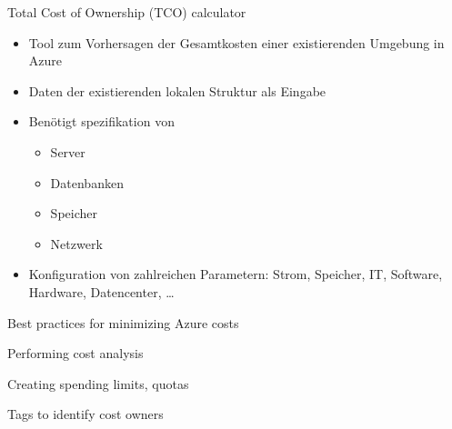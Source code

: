 \begin{flashcard}[Understand]{Total Cost of Ownership (TCO) calculator}
    \begin{itemize}
        \item Tool zum Vorhersagen der Gesamtkosten einer existierenden Umgebung in Azure
        \item Daten der existierenden lokalen Struktur als Eingabe
        \item Benötigt spezifikation von
        \begin{itemize}
            \item Server
            \item Datenbanken
            \item Speicher
            \item Netzwerk
        \end{itemize}
        \item Konfiguration von zahlreichen Parametern:\newline
        Strom, Speicher, IT, Software, Hardware, Datencenter, \ldots
    \end{itemize}

\end{flashcard}

\begin{flashcard}[Understand]{Best practices for minimizing Azure costs}

\end{flashcard}

\begin{flashcard}[Understand]{Performing cost analysis}

\end{flashcard}

\begin{flashcard}[Understand]{Creating spending limits, quotas}

\end{flashcard}

\begin{flashcard}[Understand]{Tags to identify cost owners}

\end{flashcard}

